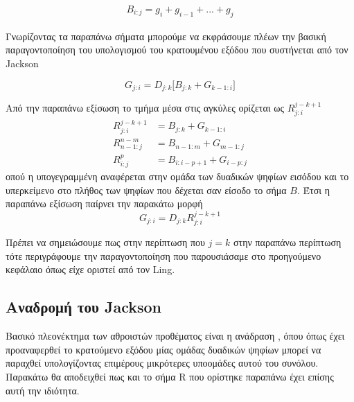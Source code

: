 \begin{equation}
\begin{split}
    B_{i:j} = g_i + g_{i-1} + ... + g_j
\end{split}
\end{equation}


Γνωρίζοντας τα παραπάνω σήματα μπορούμε να εκφράσουμε πλέων την βασική 
παραγοντοποίηση του υπολογισμού του κρατουμένου εξόδου
που συστήνεται από τον Jackson 

\begin{equation}
    G_{j:i} = D_{j:k} \Big[B_{j:k}+G_{k-1:i}\Big]
\end{equation}

Από την παραπάνω εξίσωση το τμήμα μέσα στις αγκύλες ορίζεται ως 
$R^{j-k+1}_{j:i}$ 
\begin{equation}
\begin{split}
    R^{j-k+1}_{j:i} &= B_{j:k}+G_{k-1:i}\\
    R^{n-m}_{n-1:j} &= B_{n-1:m} + G_{m-1:j}\\
    R^p_{i:j} &= B_{i:i-p+1}+G_{i-p:j}  
\end{split}
\end{equation}
οπού η υπογεγραμμένη αναφέρεται στην ομάδα των
δυαδικών ψηφίων εισόδου και το υπερκείμενο στο πλήθος των ψηφίων
που δέχεται σαν είσοδο το σήμα $B$. Έτσι η παραπάνω εξίσωση παίρνει
την παρακάτω μορφή
\begin{equation}
    G_{j:i} = D_{j:k} R^{j-k+1}_{j:i}
\end{equation}

Πρέπει να σημειώσουμε πως στην περίπτωση που $j=k$ στην παραπάνω περίπτωση 
τότε περιγράφουμε την παραγοντοποίηση που παρουσιάσαμε στο προηγούμενο
κεφάλαιο όπως είχε οριστεί από τον Ling.













\subsection{Αναδρομή του Jackson }

Βασικό πλεονέκτημα των αθροιστών προθέματος είναι η ανάδραση , όπου όπως 
έχει προαναφερθεί το κρατούμενο εξόδου μίας ομάδας δυαδικών ψηφίων μπορεί
να παραχθεί υπολογίζοντας επιμέρους μικρότερες υποομάδες αυτού του συνόλου.
Παρακάτω θα αποδειχθεί πως και το σήμα R που ορίστηκε παραπάνω έχει 
επίσης αυτή την ιδιότητα.

